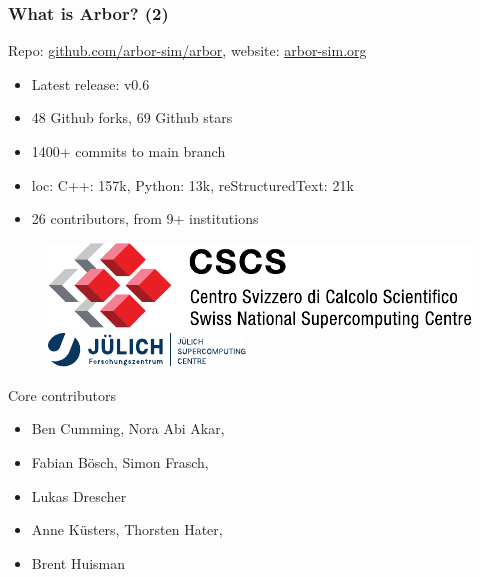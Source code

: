 \documentclass[t,aspectratio=1610]{beamer}
\begin{document}
\begin{frame}
    \frametitle{What is Arbor? (2)}

    Repo: \url{github.com/arbor-sim/arbor}, website: \url{arbor-sim.org}
    \begin{itemize}
        \item Latest release: v0.6
        \item 48 Github forks, 69 Github stars
        \item 1400+ commits to main branch
        \item loc: C++: 157k, Python: 13k, reStructuredText: 21k
        \item 26 contributors, from 9+ institutions
    \end{itemize}

    \begin{figure}
        \begin{center}
            \includegraphics[width=\linewidth]{cscs_logo.pdf}
        \end{center}
        \vspace{0.1\baselineskip}
        \begin{center}
            \includegraphics[width=\linewidth]{Logo_FZJ_JSC.pdf}
        \end{center}
    \end{figure}

    Core contributors
    \begin{itemize}
        \item Ben Cumming, Nora Abi Akar,
        \item[] Fabian Bösch, Simon Frasch,
        \item[] Lukas Drescher
        \item Anne Küsters, Thorsten Hater,
        \item[] Brent Huisman
    \end{itemize}
    

\end{frame}
\end{document}
